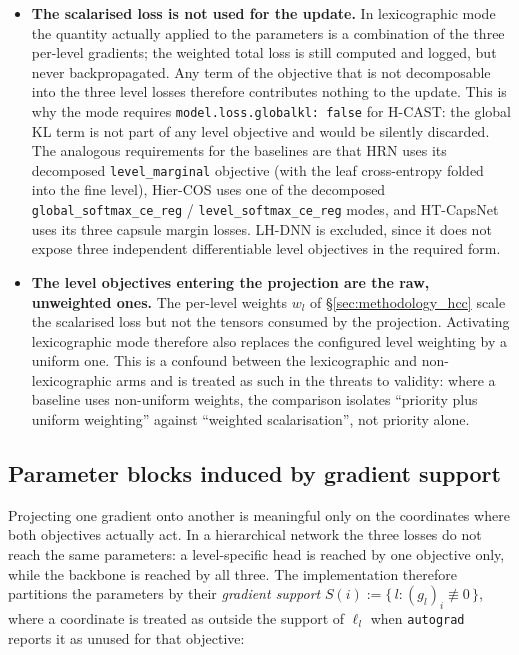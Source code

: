 \begin{itemize}
    \item \textbf{The scalarised loss is not used for the update.} In lexicographic mode the
    quantity actually applied to the parameters is a combination of the three per-level
    gradients; the weighted total loss is still computed and logged, but never backpropagated.
    Any term of the objective that is not decomposable into the three level losses therefore
    contributes nothing to the update. This is why the mode requires
    \texttt{model.loss.globalkl: false} for H-CAST: the global KL term is not part of any level
    objective and would be silently discarded. The analogous requirements for the baselines are
    that HRN uses its decomposed \texttt{level\_marginal} objective (with the leaf cross-entropy
    folded into the fine level), Hier-COS uses one of the decomposed
    \texttt{global\_softmax\_ce\_reg} / \texttt{level\_softmax\_ce\_reg} modes, and HT-CapsNet uses
    its three capsule margin losses. LH-DNN is excluded, since it does not expose three
    independent differentiable level objectives in the required form.
    \item \textbf{The level objectives entering the projection are the raw, unweighted ones.}
    The per-level weights $w_l$ of \S\ref{sec:methodology_hcc} scale the scalarised loss but not
    the tensors consumed by the projection. Activating lexicographic mode therefore also replaces
    the configured level weighting by a uniform one. This is a confound between the lexicographic
    and non-lexicographic arms and is treated as such in the threats to validity: where a
    baseline uses non-uniform weights, the comparison isolates ``priority plus uniform weighting''
    against ``weighted scalarisation'', not priority alone.
\end{itemize}

\subsection{Parameter blocks induced by gradient support}
\label{ssec:lex_blocks}

Projecting one gradient onto another is meaningful only on the coordinates where both objectives
actually act. In a hierarchical network the three losses do not reach the same parameters: a
level-specific head is reached by one objective only, while the backbone is reached by all three.
The implementation therefore partitions the parameters by their \emph{gradient support}
$S(i) := \{\,l : (g_l)_i \not\equiv 0\,\}$, where a coordinate is treated as outside the support of
$\ell_l$ when \texttt{autograd} reports it as unused for that objective:

